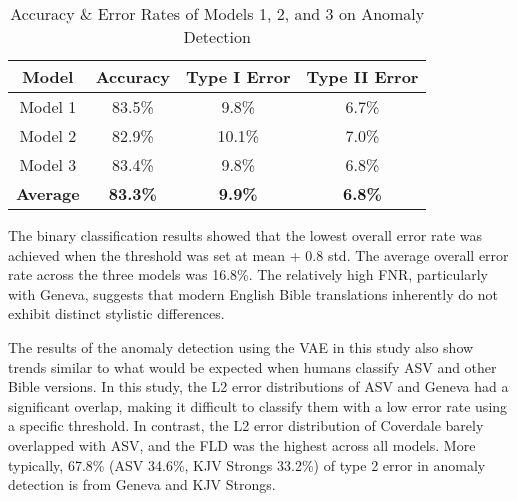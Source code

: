 \begin{table}[t]
\caption{Accuracy \& Error Rates of Models 1, 2, and 3 on Anomaly Detection}
\label{tab:accuracy}
\vskip 0.15in
\begin{center}
\begin{small}
\begin{sc}
\setlength{\tabcolsep}{4pt} %
\begin{tabular}{|c|c|c|c|}
\hline
\textbf{Model} & \textbf{Accuracy} & \textbf{Type I Error} & \textbf{Type II Error} \\
\hline
Model 1 & 83.5\% & 9.8\% & 6.7\% \\
Model 2 & 82.9\% & 10.1\% & 7.0\% \\
Model 3 & 83.4\% & 9.8\% & 6.8\% \\
\hline
\textbf{Average} & \textbf{83.3\%} & \textbf{9.9\%} & \textbf{6.8\%} \\
\hline
\end{tabular}
\end{sc}
\end{small}
\end{center}
\vskip -0.1in
\end{table}


The binary classification results showed that the lowest overall error rate was achieved when the threshold was set at mean + 0.8 std. The average overall error rate across the three models was 16.8\%. The relatively high FNR, particularly with Geneva, suggests that modern English Bible translations inherently do not exhibit distinct stylistic differences.

The results of the anomaly detection using the VAE in this study also show trends similar to what would be expected when humans classify ASV and other Bible versions. In this study, the L2 error distributions of ASV and Geneva had a significant overlap, making it difficult to classify them with a low error rate using a specific threshold. In contrast, the L2 error distribution of Coverdale barely overlapped with ASV, and the FLD was the highest across all models. More typically, 67.8\% (ASV 34.6\%, KJV Strongs 33.2\%) of type 2 error in anomaly detection is from Geneva and KJV Strongs.

